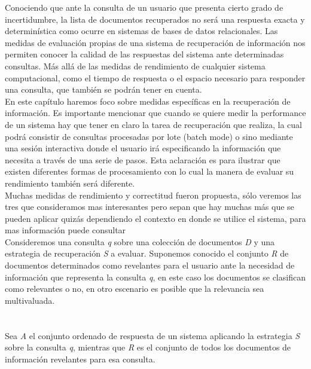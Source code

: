 
Conociendo que ante la consulta de un usuario que presenta cierto grado de incertidumbre, la lista de documentos recuperados no será una respuesta exacta y determinística como ocurre en sistemas de bases de datos relacionales. Las medidas de evaluación propias de una sistema de recuperación de información nos permiten conocer la calidad de las respuestas del sistema ante determinadas consultas. Más allá de las medidas de rendimiento de cualquier sistema computacional, como el tiempo de respuesta o el espacio necesario para responder una consulta, que también se podrán tener en cuenta. \\

En este capítulo haremos foco sobre medidas específicas en la recuperación de información. Es importante mencionar que cuando se quiere medir la performance de un sistema hay que tener en claro la tarea de recuperación que realiza, la cual podrá consistir de consultas procesadas por lote (batch mode) o sino mediante una sesión interactiva donde el usuario irá especificando la información que necesita a través de una serie de pasos. Esta aclaración es para ilustrar que existen diferentes formas de procesamiento con lo cual la manera de evaluar su rendimiento también será diferente. \\

Muchas medidas de rendimiento y correctitud fueron propuesta, sólo veremos las tres que consideramos mas interesantes pero sepan que hay muchas más que se pueden aplicar quizás dependiendo el contexto en donde se utilice el sistema, para mas información puede consultar \cite{baeza2011} \\

Consideremos una consulta \textit{q} sobre una colección de documentos \textit{D} y una estrategia de recuperación \textit{S} a evaluar. Suponemos conocido el conjunto \textit{R} de documentos determinados como revelantes para el usuario ante la necesidad de información que representa la consulta \textit{q}, en este caso los documentos se clasifican como relevantes o no, en otro escenario es posible que la relevancia sea multivaluada. \\ \\ \\
Sea \textit{A} el conjunto ordenado de respuesta de un sistema aplicando la estrategia \textit{S} sobre la consulta \textit{q}, mientras que \textit{R} es el conjunto de todos los documentos de información revelantes para esa consulta.

